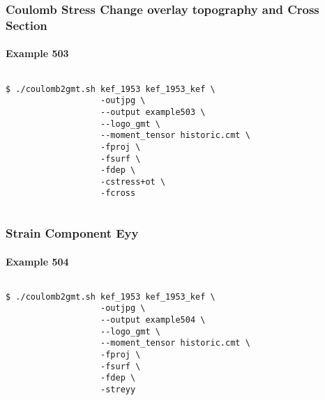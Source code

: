 \begin{frame}[t,fragile]
  \frametitle{Coulomb Stress Change overlay topography and Cross Section}
  \framesubtitle{Example 503}
  \label{ch5fr:ex503}
\begin{columns}[t]
  \begin{column}{.5\textwidth}
\begin{scriptsize}
\begin{verbatim}
$ ./coulomb2gmt.sh kef_1953 kef_1953_kef \
                   -outjpg \ 
                   --output example503 \
                   --logo_gmt \
                   --moment_tensor historic.cmt \
                   -fproj \
                   -fsurf \
                   -fdep \
                   -cstress+ot \ 
                   -fcross
\end{verbatim}
\end{scriptsize}

  \end{column}
  \begin{column}{.5\textwidth}

\centering
  \end{column}
\end{columns}

\end{frame}
\note{}

\begin{frame}[t,fragile]
  \frametitle{Strain Component Eyy}
  \framesubtitle{Example 504}
  \label{ch5fr:ex504}
\begin{columns}[t]
  \begin{column}{.5\textwidth}
\begin{scriptsize}
\begin{verbatim}
$ ./coulomb2gmt.sh kef_1953 kef_1953_kef \
                   -outjpg \ 
                   --output example504 \
                   --logo_gmt \
                   --moment_tensor historic.cmt \
                   -fproj \
                   -fsurf \
                   -fdep \
                   -streyy
\end{verbatim}
\end{scriptsize}

  \end{column}
  \begin{column}{.5\textwidth}

\centering
  \end{column}
\end{columns}

\end{frame}
\note{}

